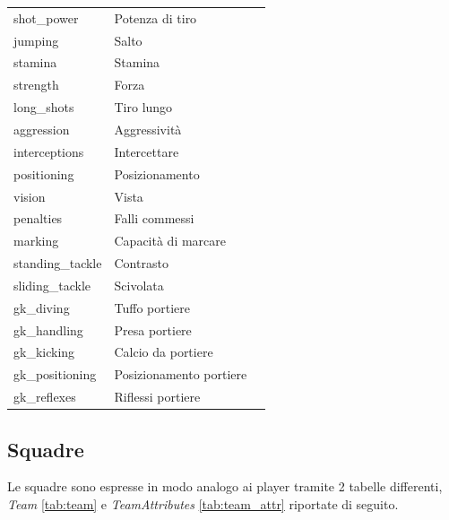 \documentclass[hidelinks, 12pt]{article}
\begin{document}
\begin{table}[H]
\begin{tabular}{|l|l|l|}
			shot\_power & Potenza di tiro \\
			jumping & Salto \\
			stamina & Stamina \\
			strength & Forza \\
			long\_shots & Tiro lungo \\
			aggression & Aggressività \\
			interceptions & Intercettare \\
			positioning & Posizionamento \\
			vision & Vista \\
			penalties & Falli commessi \\
			marking & Capacità di marcare \\
			standing\_tackle & Contrasto \\
			sliding\_tackle & Scivolata \\
			gk\_diving & Tuffo portiere \\
			gk\_handling & Presa portiere \\
			gk\_kicking & Calcio da portiere \\
			gk\_positioning & Posizionamento portiere \\
			gk\_reflexes & Riflessi portiere \\
			\hline
		\end{tabular}
	\end{table}
	
	\subsection{Squadre}
	
	Le squadre sono espresse in modo analogo ai player tramite 2 tabelle differenti, {\it Team} \ref{tab:team} e {\it TeamAttributes} \ref{tab:team_attr} riportate di seguito.
	
\end{document}
